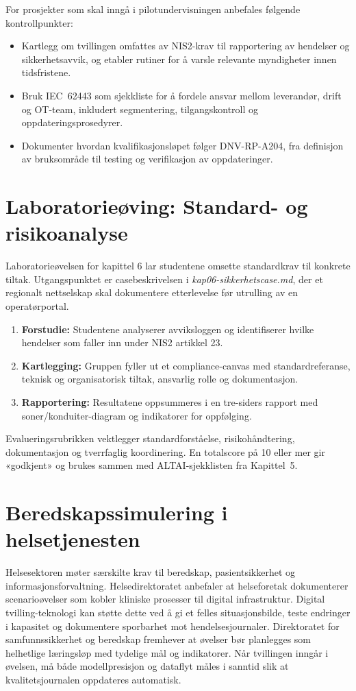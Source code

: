 For prosjekter som skal inngå i pilotundervisningen anbefales følgende kontrollpunkter:
\begin{itemize}
    \item Kartlegg om tvillingen omfattes av NIS2-krav til rapportering av hendelser og sikkerhetsavvik, og etabler rutiner for å varsle relevante myndigheter innen tidsfristene.
    \item Bruk IEC~62443 som sjekkliste for å fordele ansvar mellom leverandør, drift og OT-team, inkludert segmentering, tilgangskontroll og oppdateringsprosedyrer.
    \item Dokumenter hvordan kvalifikasjonsløpet følger DNV-RP-A204, fra definisjon av bruksområde til testing og verifikasjon av oppdateringer.
\end{itemize}
\section{Laboratorieøving: Standard- og risikoanalyse}
Laboratorieøvelsen for kapittel 6 lar studentene omsette standardkrav til konkrete tiltak. Utgangspunktet er casebeskrivelsen i \textit{kap06-sikkerhetscase.md}, der et regionalt nettselskap skal dokumentere etterlevelse før utrulling av en operatørportal.

\begin{enumerate}
    \item \textbf{Forstudie:} Studentene analyserer avviksloggen og identifiserer hvilke hendelser som faller inn under NIS2 artikkel 23.
    \item \textbf{Kartlegging:} Gruppen fyller ut et compliance-canvas med standardreferanse, teknisk og organisatorisk tiltak, ansvarlig rolle og dokumentasjon.
    \item \textbf{Rapportering:} Resultatene oppsummeres i en tre-siders rapport med soner/konduiter-diagram og indikatorer for oppfølging.
\end{enumerate}

Evalueringsrubrikken vektlegger standardforståelse, risikohåndtering, dokumentasjon og tverrfaglig koordinering. En totalscore på 10 eller mer gir «godkjent» og brukes sammen med ALTAI-sjekklisten fra Kapittel~5.

\section{Beredskapssimulering i helsetjenesten}
Helsesektoren møter særskilte krav til beredskap, pasientsikkerhet og informasjonsforvaltning. Helsedirektoratet \citet{helsedir2023beredskap} anbefaler at helseforetak dokumenterer scenarioøvelser som kobler kliniske prosesser til digital infrastruktur. Digital tvilling-teknologi kan støtte dette ved å gi et felles situasjonsbilde, teste endringer i kapasitet og dokumentere sporbarhet mot hendelsesjournaler. Direktoratet for samfunnssikkerhet og beredskap \citet{dsb2023ovelser} fremhever at øvelser bør planlegges som helhetlige læringsløp med tydelige mål og indikatorer. Når tvillingen inngår i øvelsen, må både modellpresisjon og dataflyt måles i sanntid slik at kvalitetsjournalen oppdateres automatisk.

